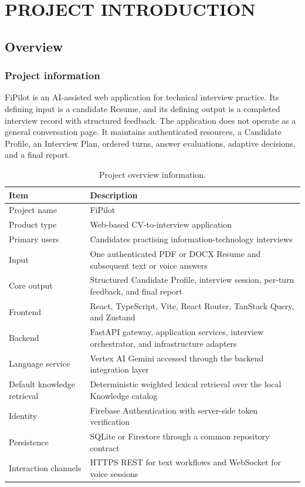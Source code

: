 \chapter{PROJECT INTRODUCTION}\label{ch:introduction}

\section{Overview}

\subsection{Project information}

FiPilot is an AI-assisted web application for technical interview practice. Its defining input is a candidate Resume, and its defining output is a completed interview record with structured feedback. The application does not operate as a general conversation page. It maintains authenticated resources, a Candidate Profile, an Interview Plan, ordered turns, answer evaluations, adaptive decisions, and a final report.

\begin{table}[htbp]\centering
\caption{Project overview information.}\label{tab:project-overview}
\begin{tabularx}{\textwidth}{p{}Y}\toprule
Item & Description\\ \midrule
Project name & FiPilot\\
Product type & Web-based CV-to-interview application\\
Primary users & Candidates practising information-technology interviews\\
Input & One authenticated PDF or DOCX Resume and subsequent text or voice answers\\
Core output & Structured Candidate Profile, interview session, per-turn feedback, and final report\\
Frontend & React, TypeScript, Vite, React Router, TanStack Query, and Zustand\\
Backend & FastAPI gateway, application services, interview orchestrator, and infrastructure adapters\\
Language service & Vertex AI Gemini accessed through the backend integration layer\\
Default knowledge retrieval & Deterministic weighted lexical retrieval over the local Knowledge catalog\\
Identity & Firebase Authentication with server-side token verification\\
Persistence & SQLite or Firestore through a common repository contract\\
Interaction channels & HTTPS REST for text workflows and WebSocket for voice sessions\\
\bottomrule\end{tabularx}
\end{table}

